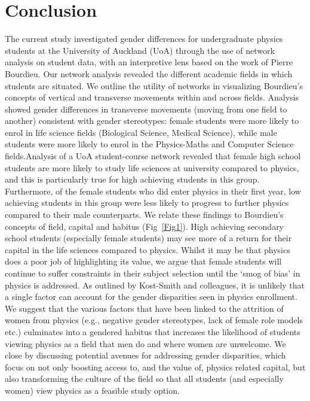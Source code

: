 \section{Conclusion}
The current study investigated gender differences for undergraduate physics students at the University of Auckland (UoA) through the use of network analysis on student data, with an interpretive lens based on the work of Pierre Bourdieu. Our network analysis revealed the different academic fields in which students are situated. We outline the utility of networks in visualizing Bourdieu's concepts of vertical and transverse movements within and across fields. Analysis showed gender differences in transverse movements (moving from one field to another) consistent with gender stereotypes: female students were more likely to enrol in life science fields (Biological Science, Medical Science), while male students were more likely to enrol in the Physics-Maths and Computer Science fields.Analysis of a UoA student-course network revealed that female high school students are more likely to study life sciences at university compared to physics, and this is particularly true for high achieving students in this group. Furthermore, of the female students who did enter physics in their first year, low achieving students in this group were less likely to progress to further physics compared to their male counterparts. We relate these findings to Bourdieu's concepts of field, capital and habitus (Fig~\ref{Fig1}). High achieving secondary school students (especially female students) may see more of a return for their capital in the life sciences compared to physics. Whilst it may be that physics does a poor job of highlighting its value, we argue that female students will continue to suffer constraints in their subject selection until the `smog of bias'\cite{Kost_Smith_2010} in physics is addressed. As outlined by Kost-Smith and colleagues\cite{Kost_Smith_2010}, it is unlikely that a single factor can account for the gender disparities seen in physics enrollment. We suggest that the various factors that have been linked to the attrition of women from physics (e.g., negative gender stereotypes, lack of female role models etc.) culminates into a gendered habitus that increases the likelihood of students viewing physics as a field that men do and where women are unwelcome. We close by discussing potential avenues for addressing gender disparities, which focus on not only boosting access to, and the value of, physics related capital, but also transforming the culture of the field so that all students (and especially women) view physics as a feasible study option.





